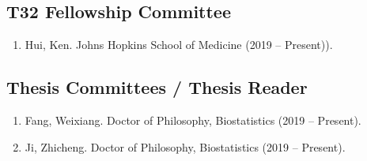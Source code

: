 \documentclass[10pt]{article}
\newcommand{\dn}[1]{{\color{black} {#1}}}
\newcommand{\myben}[1]{\smallskip\begin{enumerate}[start=1,label={\scriptsize \arabic*$\ $},leftmargin=\parindent]\setlength{\itemsep}{#1}\vspace*{-0.7em}}
\newcommand{\mydot}[1]{\begin{enumerate}[label=$\circ$,leftmargin=\parindent]\setlength{\itemsep}{#1}}
\newcommand{\ee}{\end{enumerate}}
\newcommand{\mylift}[1]{\vspace*{#1}}
\begin{document}
\subsection*{T32 Fellowship Committee}

\myben{-0.1em}

\item Hui, Ken. Johns Hopkins School of Medicine (2019 -- Present)).

\ee

\mylift{-1.5em}

\subsection*{Thesis Committees / Thesis Reader}

\myben{-0.1em}

\item \dn{Fang}, Weixiang. Doctor of Philosophy, Biostatistics (2019 -- Present).
\item \dn{Ji}, Zhicheng. Doctor of Philosophy, Biostatistics (2019 -- Present).


\ee









\end{document}
